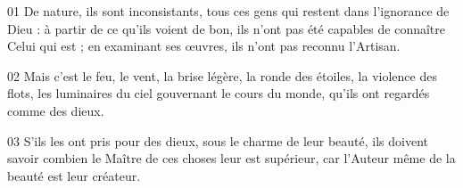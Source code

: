 01 De nature, ils sont inconsistants, tous ces gens qui restent dans l’ignorance de Dieu : à partir de ce qu’ils voient de bon, ils n’ont pas été capables de connaître Celui qui est ; en examinant ses œuvres, ils n’ont pas reconnu l’Artisan.

02 Mais c’est le feu, le vent, la brise légère, la ronde des étoiles, la violence des flots, les luminaires du ciel gouvernant le cours du monde, qu’ils ont regardés comme des dieux.

03 S’ils les ont pris pour des dieux, sous le charme de leur beauté, ils doivent savoir combien le Maître de ces choses leur est supérieur, car l’Auteur même de la beauté est leur créateur.
